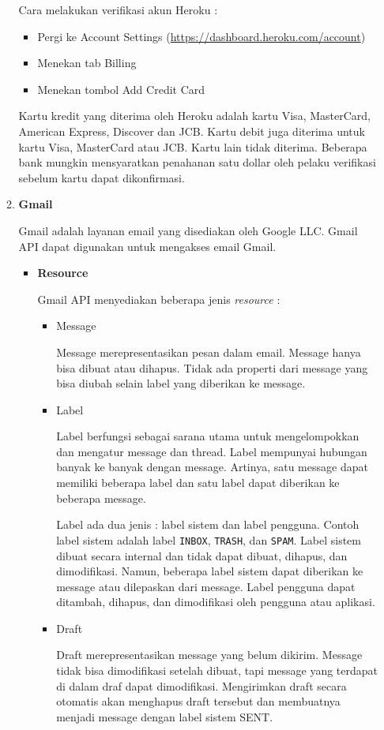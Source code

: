 \documentclass[a4paper,twoside]{article}
\begin{document}
\begin{enumerate}
\begin{enumerate}
Cara melakukan verifikasi akun Heroku :
\begin{itemize}
\item Pergi ke Account Settings (\url{https://dashboard.heroku.com/account})
\item Menekan tab Billing
\item Menekan tombol Add Credit Card
\end{itemize}

Kartu kredit yang diterima oleh Heroku adalah kartu Visa, MasterCard, American Express, Discover dan JCB. Kartu debit juga diterima untuk kartu Visa, MasterCard atau JCB. Kartu lain tidak diterima. Beberapa bank mungkin mensyaratkan penahanan satu dollar oleh pelaku verifikasi sebelum kartu dapat dikonfirmasi.
		
		\item \textbf{Gmail}		
		
		Gmail adalah layanan email yang disediakan oleh Google LLC. Gmail API dapat digunakan untuk mengakses email Gmail.

		\begin{itemize}
			\item \textbf{Resource}
			
			Gmail API menyediakan beberapa jenis \textit{resource} :
\begin{itemize}
\item Message

Message merepresentasikan pesan dalam email. Message hanya bisa dibuat atau dihapus. Tidak ada properti dari message yang bisa diubah selain label yang diberikan ke message.

\item Label

Label berfungsi sebagai sarana utama untuk mengelompokkan dan mengatur message dan thread. Label mempunyai hubungan banyak ke banyak dengan message. Artinya, satu message dapat memiliki beberapa label dan satu label dapat diberikan ke beberapa message.

Label ada dua jenis : label sistem dan label pengguna. Contoh label sistem adalah label \texttt{INBOX}, \texttt{TRASH}, dan \texttt{SPAM}. Label sistem dibuat secara internal dan tidak dapat dibuat, dihapus, dan dimodifikasi. Namun, beberapa label sistem dapat diberikan ke message atau dilepaskan dari message. Label pengguna dapat ditambah, dihapus, dan dimodifikasi oleh pengguna atau aplikasi.

\item Draft

Draft merepresentasikan message yang belum dikirim. Message tidak bisa dimodifikasi setelah dibuat, tapi message yang terdapat di dalam draf dapat dimodifikasi. Mengirimkan draft secara otomatis akan menghapus draft tersebut dan membuatnya menjadi message dengan label sistem SENT.


\end{itemize}
\end{itemize}
\end{enumerate}
\end{enumerate}
\end{document}
